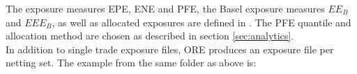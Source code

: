 The exposure measures EPE, ENE and PFE, the Basel exposure measures $EE_B$ and $EEE_B$, as well as allocated exposures
are defined in \cite{methods}. The PFE quantile and allocation method are chosen as described in section \ref{sec:analytics}. \\

In addition to single trade exposure files, ORE produces an exposure file per netting set. The example from the same
folder as above is:

\begin{center}
\end{center}
